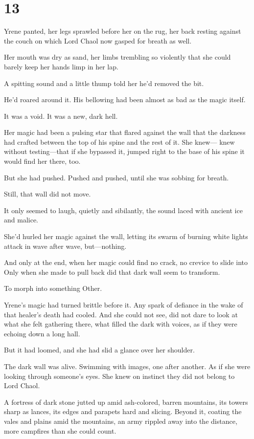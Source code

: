 
\chapter{13}

Yrene panted, her legs sprawled before her on the rug, her back resting against the couch on which Lord Chaol now gasped for breath as well.

Her mouth was dry as sand, her limbs trembling so violently that she could barely keep her hands limp in her lap.

A spitting sound and a little thump told her he'd removed the bit.

He'd roared around it. His bellowing had been almost as bad as the magic itself.

It was a void. It was a new, dark hell.

Her magic had been a pulsing star that flared against the wall that the darkness had crafted between the top of his spine and the rest of it. She knew--- knew without testing---that if she bypassed it, jumped right to the base of his spine  it would find her there, too.

But she had pushed. Pushed and pushed, until she was sobbing for breath.

Still, that wall did not move.

It only seemed to laugh, quietly and sibilantly, the sound laced with ancient ice and malice.

She'd hurled her magic against the wall, letting its swarm of burning white lights attack in wave after wave, but---nothing.

And only at the end, when her magic could find no crack, no crevice to slide into  Only when she made to pull back did that dark wall seem to transform.

To morph into something  Other.

Yrene's magic had turned brittle before it. Any spark of defiance in the wake of that healer's death had cooled. And she could not see, did not dare to look at what she felt gathering there, what filled the dark with voices, as if they were echoing down a long hall.

But it had loomed, and she had slid a glance over her shoulder.

The dark wall was alive. Swimming with images, one after another. As if she were looking through someone's eyes. She knew on instinct they did not belong to Lord Chaol.

A fortress of dark stone jutted up amid ash-colored, barren mountains, its towers sharp as lances, its edges and parapets hard and slicing. Beyond it, coating the vales and plains amid the mountains, an army rippled away into the distance, more campfires than she could count.

